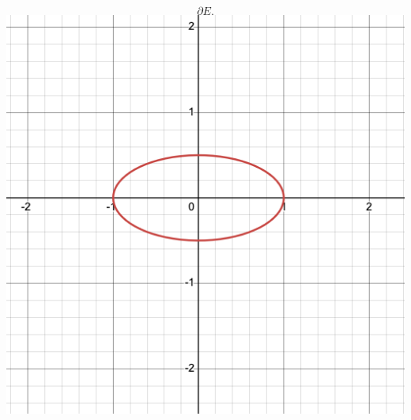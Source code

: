 \documentclass{eeleyes}
\begin{document}
\begin{multicols}{3}
\columnbreak

\begin{center}
    \[
        \partial E
    .\]
    \includegraphics[width=0.8\linewidth]{figures/i_img-3.png}
\end{center}
\end{multicols}
\end{document}
